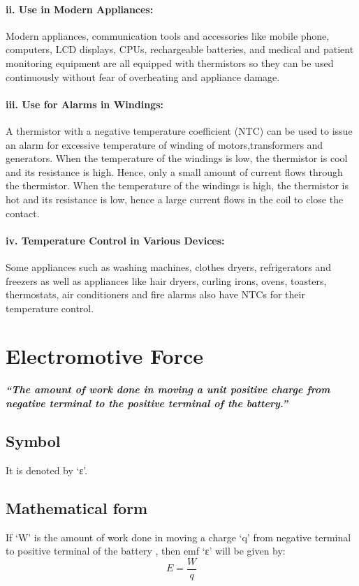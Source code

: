 \paragraph{ii. Use in Modern Appliances:}
Modern appliances, communication tools and accessories like mobile phone, computers, LCD displays, CPUs, rechargeable batteries, and medical and patient monitoring equipment are all equipped with thermistors so they can be used continuously without fear of overheating and appliance damage.
\paragraph{iii. Use for Alarms in Windings:}
A thermistor with a negative temperature coefficient (NTC) can be used to issue an alarm for excessive temperature of winding of motors,transformers and generators. When the temperature of the windings is low, the thermistor is cool and its resistance is high. Hence, only a small amount of current flows through the thermistor. When the temperature of the windings is high, the thermistor is hot and its resistance is low, hence a large current flows in the coil to close the contact.
\paragraph{iv. Temperature Control in Various Devices:}
Some appliances such as washing machines, clothes dryers, refrigerators and freezers as well as appliances like hair dryers, curling irons, ovens, toasters, thermostats, air conditioners and fire alarms also have NTCs for their temperature control. 
\section{Electromotive Force}
\textit{\textbf{``The amount of work done in moving a unit positive charge from negative terminal to the positive terminal of the battery.”}}
\subsection*{Symbol}
It is denoted by ‘ε’.
\subsection*{Mathematical form}
If ‘W’ is the amount of work done in moving a charge ‘q’ from negative terminal to positive terminal of the battery , then emf ‘ε’ will be
 given by:
\begin{equation}\nonumber
     E = \frac{W}{q}
\end{equation}
